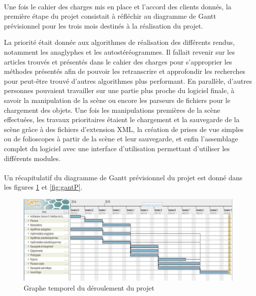 \paragraph{}
Une fois le cahier des charges mis en place et l'accord des clients donnés, la première étape du projet consistait à réfléchir au diagramme de Gantt prévisionnel pour les trois mois destinés à la réalisation du projet.

La priorité était donnée aux algorithmes de réalisation des différents rendus, notamment les anaglyphes et les autostéréogrammes. Il fallait revenir sur les articles trouvés et présentés dans le cahier des charges pour s'approprier les méthodes présentés afin de pouvoir les retranscrire et approfondir les recherches pour peut-être trouvé d'autres algorithmes plus performant.
En parallèle, d'autres personnes pouvaient travailler sur une partie plus proche du logiciel finale, à savoir la manipulation de la scène ou encore les parseurs de fichiers pour le chargement des objets.
Une fois les manipulations premières de la scène effectuées, les travaux prioritaires étaient le chargement et la sauvegarde de la scène grâce à des fichiers d'extension XML, la création de prises de vue simples ou de folioscopes à partir de la scène et leur sauvegarde, et enfin l'assemblage complet du logiciel avec une interface d'utilisation permettant d'utiliser les différents modules.


\paragraph{}
Un récapitulatif du diagramme de Gantt prévisionnel du projet est donné dans les figures \ref{fig:graphGantP} et \ref{fig:gantP}.

\newpage
\begin{figure}[h]
	\centering
	\begin{sideways}
                \includegraphics[scale=0.42]{graphGantP.jpg}
        \end{sideways}
	\caption{\label{fig:graphGantP} Graphe temporel du déroulement du projet \protect \footnotemark }
\end{figure}

